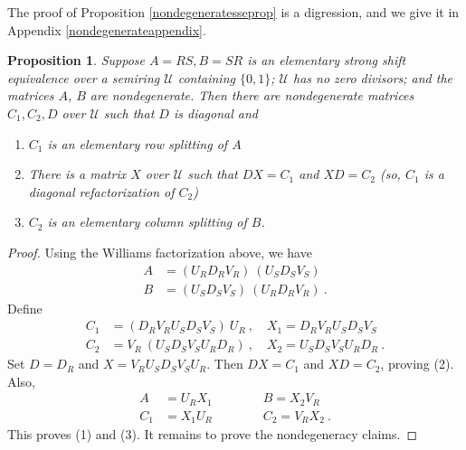 \documentclass{amsart}
\newtheorem{proposition}[theorem]{Proposition}
\theoremstyle{definition}
\newtheorem{definition}[theorem]{Definition}
\theoremstyle{remark}
\numberwithin{equation}{section}
\begin{document}
{The proof of Proposition \ref{nondegeneratesseprop} is a digression, 
and we give it in Appendix \ref{nondegenerateappendix}.  


\begin{proposition} 
\label{decompprop}
Suppose $A=RS, B=SR$ 
is an elementary strong shift equivalence  
over a semiring $\mathcal U$ containing $\{0,1\}$; 
$\mathcal U$ has no zero divisors; and the matrices 
$A$, $B$ are nondegenerate.   
Then there are nondegenerate matrices $C_1,C_2,D$ 
over $\mathcal U$ such that 
$D$ is diagonal and 
\begin{enumerate} 
\item 
$C_1$ is an elementary row splitting of $A$ 
\item 
There is a matrix $X$ over $\mathcal U$ such that 
$DX=C_1$ and $XD=C_2$ \newline 
(so, $C_1$ is a diagonal refactorization of $C_2$) 
\item 
$C_2$ is an elementary column splitting of $B$. 
\end{enumerate} 
\end{proposition} 

\begin{proof} 

Using the Williams factorization above, we have 
\begin{align*}
A &= (U_RD_RV_R)\ ( U_SD_SV_S) \\ 
B &= (U_SD_SV_S)\ ( U_RD_RV_R) \ . 
\end{align*} 
Define 
\begin{align*}
C_1 &= (D_RV_RU_SD_SV_S)\  U_R  \ , \quad 
X_1 = D_RV_RU_SD_SV_S 
\\ 
C_2 &= 
V_R\ (U_SD_SV_SU_RD_R ) 
\ , \quad 
X_2 = U_SD_SV_SU_RD_R\ . 
\end{align*} 
Set $D=D_R$ and 
  $X= V_RU_SD_SV_SU_R$.  Then 
 $DX=C_1$ and $XD=C_2$, proving (2). Also, 
\begin{align*} 
A   &= 
 U_RX_1 
\qquad \qquad 
B = 
X_2 V_R
\\
C_1 &
=  X_1U_R 
\qquad \qquad 
C_2 
= V_RX_2\ . 
\end{align*}
This proves (1) and (3). It remains to prove the nondegeneracy 
claims. 



\end{proof}}
\end{document}

